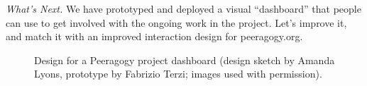 

\begin{framed}
\noindent 
\emph{What's Next.}
We have prototyped and deployed a visual ``dashboard'' that people can use to get involved with the ongoing work in the project.  Let's improve it, and match it with an improved interaction design for peeragogy.org.
\end{framed}    


\begin{figure}
\caption{Design for a Peeragogy project dashboard (design sketch by Amanda Lyons, prototype by Fabrizio Terzi; images used with permission).\label{dashboard}}
\end{figure}

